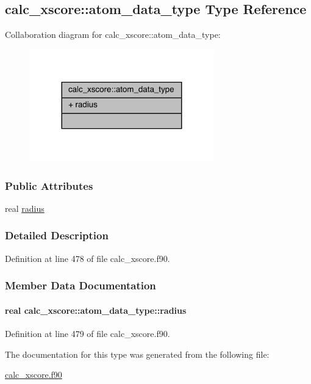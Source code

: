 \hypertarget{structcalc__xscore_1_1atom__data__type}{\subsection{calc\-\_\-xscore\-:\-:atom\-\_\-data\-\_\-type Type Reference}
\label{structcalc__xscore_1_1atom__data__type}
}


Collaboration diagram for calc\-\_\-xscore\-:\-:atom\-\_\-data\-\_\-type\-:
\nopagebreak
\begin{figure}[H]
\begin{center}
\leavevmode
\includegraphics[width=227pt]{structcalc__xscore_1_1atom__data__type__coll__graph}
\end{center}
\end{figure}
\subsubsection*{Public Attributes}
\begin{DoxyCompactItemize}
\item 
real \hyperlink{structcalc__xscore_1_1atom__data__type_a226c6d0ee378ad9e10ee3967e6a9249e}{radius}
\end{DoxyCompactItemize}


\subsubsection{Detailed Description}


Definition at line 478 of file calc\-\_\-xscore.\-f90.



\subsubsection{Member Data Documentation}
\hypertarget{structcalc__xscore_1_1atom__data__type_a226c6d0ee378ad9e10ee3967e6a9249e}{
\paragraph[{radius}]{\setlength{\rightskip}{0pt plus 5cm}real calc\-\_\-xscore\-::atom\-\_\-data\-\_\-type\-::radius}}\label{structcalc__xscore_1_1atom__data__type_a226c6d0ee378ad9e10ee3967e6a9249e}


Definition at line 479 of file calc\-\_\-xscore.\-f90.



The documentation for this type was generated from the following file\-:\begin{DoxyCompactItemize}
\item 
\hyperlink{calc__xscore_8f90}{calc\-\_\-xscore.\-f90}\end{DoxyCompactItemize}
